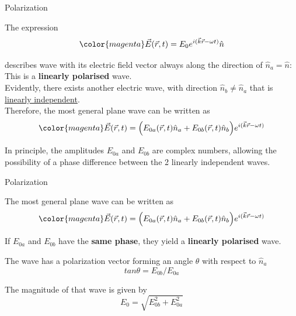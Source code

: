 \begin{frame}{Polarization}

The expression
\begin{equation*}
     {\color{magenta} \vec{E}(\vec{r},t) = E_0  e^{i (\vec{k} \vec{r} -\omega t)} \hat{n} }
\end{equation*}

describes wave with its electric field vector always along the direction
of $\hat{n}_a = \hat{n}$: This is a {\bf linearly polarised} wave.\\

\vspace{0.3cm}
Evidently, there exists another electric wave, with direction $\hat{n}_b \ne \hat{n}_a$
that is \underline{linearly independent}.\\

\vspace{0.3cm}
Therefore, the most general plane wave can be written as
\begin{equation*}
     {\color{magenta} \vec{E}(\vec{r},t) =
        \Big( E_{0a}(\vec{r},t) \hat{n}_a + E_{0b}(\vec{r},t) \hat{n}_b \Big)  e^{i (\vec{k} \vec{r} -\omega t)}  }
\end{equation*}

\vspace{0.3cm}
In principle, the amplitudes $E_{0a}$ and $E_{0b}$ are complex numbers,
allowing the possibility of a phase difference between the 2 linearly independent waves.

\end{frame}

%
%
%

\begin{frame}{Polarization}

The most general plane wave can be written as
\begin{equation*}
     {\color{magenta} \vec{E}(\vec{r},t) =
        \Big( E_{0a}(\vec{r},t) \hat{n}_a + E_{0b}(\vec{r},t) \hat{n}_b \Big)  e^{i (\vec{k} \vec{r} -\omega t)}  }
\end{equation*}

If $E_{0a}$ and $E_{0b}$ have the {\bf same phase},
they yield a {\bf linearly polarised} wave.

The wave has a polarization vector forming an
angle $\theta$ with respect to $\hat{n}_a$
\begin{equation*}
  tan\theta = E_{0b} / E_{0a}
\end{equation*}

The magnitude of that wave is given by
\begin{equation*}
  E_0 = \sqrt{E_{0b}^2 + E_{0a}^2}
\end{equation*}

\end{frame}

